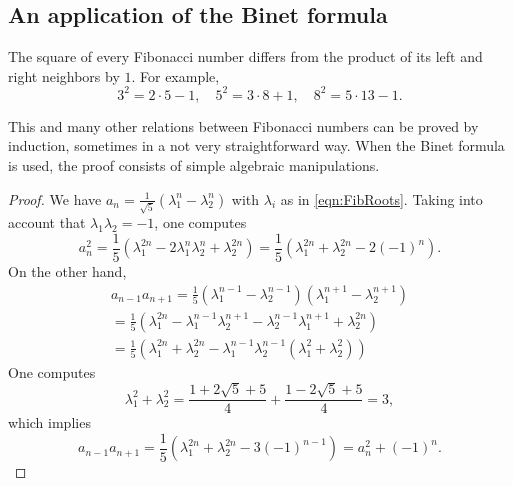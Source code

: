 \begin{page}
\setcounter{section}{1}
\setcounter{subsection}{5}
\setcounter{dfn}{7}
\label{portion:811}

\subsection{An application of the Binet formula}

\end{page}

\begin{page}
\setcounter{section}{1}
\setcounter{subsection}{5}
\setcounter{dfn}{8}
\label{portion:813}

\begin{thm}
The square of every Fibonacci number differs from the product of its left and right neighbors by $1$.
For example,
\[
3^2 = 2 \cdot 5 - 1, \quad 5^2 = 3 \cdot 8 + 1, \quad 8^2 = 5 \cdot 13 - 1.
\]
\end{thm}

\end{page}

\begin{page}
\setcounter{section}{2}
\setcounter{subsection}{0}
\setcounter{dfn}{8}
\label{portion:814}

This and many other relations between Fibonacci numbers can be proved by induction,
sometimes in a not very straightforward way.
When the Binet formula is used, the proof consists of simple algebraic manipulations.

\begin{proof}
We have $a_n = \frac{1}{\sqrt{5}}(\lambda_1^n - \lambda_2^n)$ with $\lambda_i$ as in \eqref{eqn:FibRoots}.
Taking into account that $\lambda_1\lambda_2 = -1$, one computes
\[
a_n^2 = \frac15(\lambda_1^{2n} - 2 \lambda_1^n \lambda_2^n + \lambda_2^{2n}) = \frac15(\lambda_1^{2n} + \lambda_2^{2n} - 2(-1)^n).
\]
On the other hand,
\begin{multline*}
a_{n-1} a_{n+1} = \frac15(\lambda_1^{n-1} - \lambda_2^{n-1})(\lambda_1^{n+1} - \lambda_2^{n+1})\\
= \frac15(\lambda_1^{2n} - \lambda_1^{n-1}\lambda_2^{n+1} - \lambda_2^{n-1}\lambda_1^{n+1} + \lambda_2^{2n})\\
= \frac15(\lambda_1^{2n} + \lambda_2^{2n} - \lambda_1^{n-1}\lambda_2^{n-1}(\lambda_1^2 + \lambda_2^2))
\end{multline*}
One computes
\[
\lambda_1^2 + \lambda_2^2 = \frac{1 + 2\sqrt{5} + 5}4 + \frac{1 - 2\sqrt{5} + 5}4 = 3,
\]
which implies
\[
a_{n-1} a_{n+1} = \frac15(\lambda_1^{2n} + \lambda_2^{2n} - 3(-1)^{n-1}) = a_n^2 + (-1)^n.
\]
\end{proof}





\end{page}

